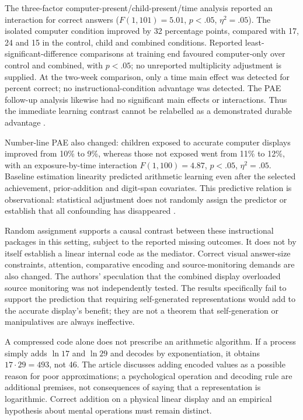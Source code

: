 The three-factor computer-present/child-present/time analysis
reported an interaction for correct answers
(\(F(1,101)=5.01\), \(p<.05\), \(\eta^2=.05\)). The isolated
computer condition improved by 32 percentage points, compared
with 17, 24 and 15 in the control, child and combined conditions.
Reported least-significant-difference comparisons at training end
favoured computer-only over control and combined, with
\(p<.05\); no unreported multiplicity adjustment is supplied.
At the two-week comparison, only a time main effect was detected
for percent correct; no instructional-condition advantage was
detected. The PAE follow-up analysis likewise had no significant
main effects or interactions. Thus the immediate learning
contrast cannot be relabelled as a demonstrated durable advantage
\cite[pp.~1025--1026 and Table 4]{BoothSiegler2008ArithmeticNL}.

Number-line PAE also changed: children exposed to accurate computer
displays improved from 10\% to 9\%, whereas those not exposed
went from 11\% to 12\%, with an exposure-by-time interaction
\(F(1,100)=4.87\), \(p<.05\), \(\eta^2=.05\).
Baseline estimation linearity predicted arithmetic learning even
after the selected achievement, prior-addition and digit-span
covariates. This predictive relation is observational: statistical
adjustment does not randomly assign the predictor or establish that
all confounding has disappeared
\cite[pp.~1024--1027]{BoothSiegler2008ArithmeticNL}.

Random assignment supports a causal contrast between these
instructional packages in this setting, subject to the reported
missing outcomes. It does not by itself establish a linear internal
code as the mediator. Correct visual answer-size constraints,
attention, comparative encoding and source-monitoring demands are
also changed. The authors' speculation that the combined display
overloaded source monitoring was not independently tested.
The results specifically fail to support the prediction that requiring
self-generated representations would add to the accurate display's
benefit; they are not a theorem that self-generation or manipulatives
are always ineffective.

A compressed code alone does not prescribe an arithmetic algorithm.
If a process simply adds \(\ln17\) and \(\ln29\) and decodes
by exponentiation, it obtains \(17\cdot29=493\), not 46.
The article discusses adding encoded values as a possible reason
for poor approximations; a psychological operation and decoding
rule are additional premises, not consequences of saying that a
representation is logarithmic. Correct addition on a physical
linear display and an empirical hypothesis about mental operations
must remain distinct.

